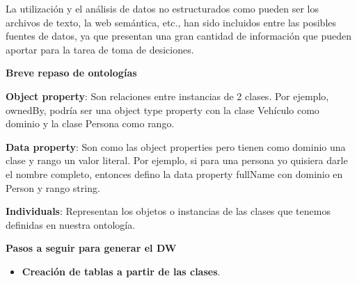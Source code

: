 \documentclass{fancyslides}
\begin{document}
\begin{frame}
\end{frame}

\begin{frame}
\misc
{ 
\justifying La utilización y el análisis de datos no estructurados como pueden ser los archivos de texto, la web semántica, etc., han sido incluidos entre las posibles fuentes de datos, ya que presentan una gran cantidad de información que pueden aportar para la tarea de toma de desiciones.

}
\end{frame}

\begin{frame}
\misc
{ \textbf{\Large Breve repaso de ontologías}
\newline
\newline

\justifying \textbf{Object property}: Son relaciones entre instancias de 2 clases. Por ejemplo, ownedBy, podría ser una object type property con la clase Vehículo como dominio y la clase Persona como rango.

\justifying \textbf{Data property}: Son como las object properties pero tienen como dominio una clase y rango un valor literal. Por ejemplo, si para una persona yo quisiera darle el nombre completo, entonces defino la data property fullName con dominio en Person y rango string.

\justifying \textbf{Individuals}: Representan los objetos o instancias de las clases que tenemos definidas en nuestra ontología.

}
\end{frame}


\begin{frame}
\misc
{ \textbf{\Large Pasos a seguir para generar el DW}
\newline
\newline

\begin{itemize}
  \item \textbf{Creación de tablas a partir de las clases}.
\end{itemize}


}
\end{frame}
\end{document}
